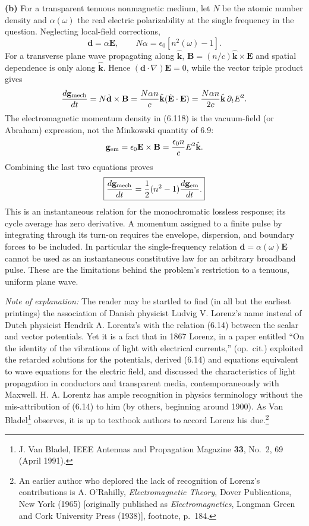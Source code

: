 \textbf{(b)} For a transparent tenuous nonmagnetic medium, let $N$ be the
atomic number density and $\alpha(\omega)$ the real electric polarizability
at the single frequency in the question. Neglecting local-field corrections,
\[
\mathbf d=\alpha\mathbf E,\qquad
N\alpha=\epsilon_0[n^2(\omega)-1].
\]
For a transverse plane wave propagating along $\hat{\mathbf k}$,
$\mathbf B=(n/c)\hat{\mathbf k}\times\mathbf E$ and spatial dependence
is only along $\hat{\mathbf k}$. Hence
$(\mathbf d\cdot\nabla)\mathbf E=0$, while the vector triple product gives
\[
\frac{d\mathbf g_{\rm mech}}{dt}
=N\dot{\mathbf d}\times\mathbf B
=\frac{N\alpha n}{c}\hat{\mathbf k}(\dot{\mathbf E}\cdot\mathbf E)
=\frac{N\alpha n}{2c}\hat{\mathbf k}\,\partial_t E^2.
\]
The electromagnetic momentum density in (6.118) is the vacuum-field
(or Abraham) expression, not the Minkowski quantity of 6.9:
\[
\mathbf g_{\rm em}=\epsilon_0\mathbf E\times\mathbf B
=\frac{\epsilon_0n}{c}E^2\hat{\mathbf k}.
\]
Combining the last two equations proves
\[
\boxed{\frac{d\mathbf g_{\rm mech}}{dt}
=\frac12(n^2-1)\frac{d\mathbf g_{\rm em}}{dt}.}
\]
This is an instantaneous relation for the monochromatic lossless response;
its cycle average has zero derivative. A momentum assigned to a finite
pulse by integrating through its turn-on requires the envelope, dispersion,
and boundary forces to be included. In particular the single-frequency
relation $\mathbf d=\alpha(\omega)\mathbf E$ cannot be used as an
instantaneous constitutive law for an arbitrary broadband pulse. These
are the limitations behind the problem's restriction to a tenuous,
uniform plane wave.


\medskip
\noindent\emph{Note of explanation:} The reader may be startled to find (in all but the earliest printings) the association of Danish physicist Ludvig V. Lorenz's name instead of Dutch physicist Hendrik A. Lorentz's with the relation (6.14) between the scalar and vector potentials. Yet it is a fact that in 1867 Lorenz, in a paper entitled ``On the identity of the vibrations of light with electrical currents,'' (op.\ cit.) exploited the retarded solutions for the potentials, derived (6.14) and equations equivalent to wave equations for the electric field, and discussed the characteristics of light propagation in conductors and transparent media, contemporaneously with Maxwell. H. A. Lorentz has ample recognition in physics terminology without the mis-attribution of (6.14) to him (by others, beginning around 1900). As Van Bladel\footnote{J. Van Bladel, IEEE Antennas and Propagation Magazine \textbf{33}, No.~2, 69 (April 1991).} observes, it is up to textbook authors to accord Lorenz his due.\footnote{An earlier author who deplored the lack of recognition of Lorenz's contributions is A. O'Rahilly, \emph{Electromagnetic Theory}, Dover Publications, New York (1965) [originally published as \emph{Electromagnetics}, Longman Green and Cork University Press (1938)], footnote, p.~184.}
